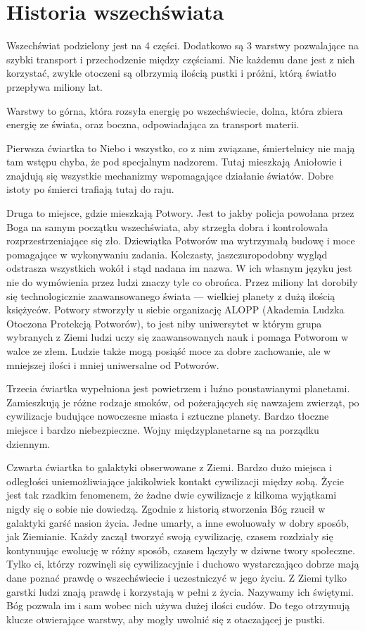 \chapter{Historia wszechświata}
Wszechświat podzielony jest na 4 części. Dodatkowo są 3 warstwy pozwalające na szybki transport i przechodzenie między częściami.
Nie każdemu dane jest z nich korzystać, zwykle otoczeni są olbrzymią ilością pustki i próżni, którą światło przepływa miliony lat.

Warstwy to górna, która rozsyła energię po wszechświecie, dolna, która zbiera energię ze świata, oraz
boczna, odpowiadająca za transport materii.

Pierwsza ćwiartka to Niebo i wszystko, co z nim związane, śmiertelnicy nie mają tam wstępu chyba, że pod specjalnym nadzorem.
Tutaj mieszkają Aniołowie i znajdują się wszystkie mechanizmy wspomagające działanie światów.
Dobre istoty po śmierci trafiają tutaj do raju.

Druga to miejsce, gdzie mieszkają Potwory.
Jest to jakby policja powołana przez Boga na samym początku wszechświata, aby strzegła dobra i kontrolowała rozprzestrzeniające się zło.
Dziewiątka Potworów ma wytrzymałą budowę i moce pomagające w wykonywaniu zadania.
Kolczasty, jaszczuropodobny wygląd odstrasza wszystkich wokół i stąd nadana im nazwa. W ich własnym języku jest nie do wymówienia przez ludzi znaczy tyle co obrońca.
Przez miliony lat dorobiły się technologicznie zaawansowanego świata --- wielkiej planety z dużą ilością księżyców.
Potwory stworzyły u siebie organizację ALOPP (Akademia Ludzka Otoczona Protekcją Potworów), to jest niby uniwersytet w którym grupa wybranych z Ziemi ludzi uczy się zaawansowanych nauk i pomaga Potworom w walce ze złem.
Ludzie także mogą posiąść moce za dobre zachowanie, ale w mniejszej ilości i mniej uniwersalne od Potworów.

Trzecia ćwiartka wypełniona jest powietrzem i luźno poustawianymi planetami.
Zamieszkują je różne rodzaje smoków, od pożerających się nawzajem zwierząt, po cywilizacje budujące nowoczesne miasta i sztuczne planety.
Bardzo tłoczne miejsce i bardzo niebezpieczne. Wojny międzyplanetarne są na porządku dziennym.

Czwarta ćwiartka to galaktyki obserwowane z Ziemi.
Bardzo dużo miejsca i odległości uniemożliwiające jakikolwiek kontakt cywilizacji między sobą.
Życie jest tak rzadkim fenomenem, że żadne dwie cywilizacje z kilkoma wyjątkami nigdy się o sobie nie dowiedzą.
Zgodnie z historią stworzenia Bóg rzucił w galaktyki garść nasion życia. Jedne umarły, a inne ewoluowały w dobry sposób, jak Ziemianie.
Każdy zaczął tworzyć swoją cywilizację, czasem rozdziały się kontynuując ewolucję w różny sposób, czasem łączyły w dziwne twory społeczne.
Tylko ci, którzy rozwinęli się cywilizacyjnie i duchowo wystarczająco dobrze mają dane poznać prawdę o wszechświecie i uczestniczyć w jego życiu.
Z Ziemi tylko garstki ludzi znają prawdę i korzystają w pełni z życia. Nazywamy ich świętymi.
Bóg pozwala im i sam wobec nich używa dużej ilości cudów. Do tego otrzymują klucze otwierające warstwy, aby mogły uwolnić się z otaczającej je pustki.

